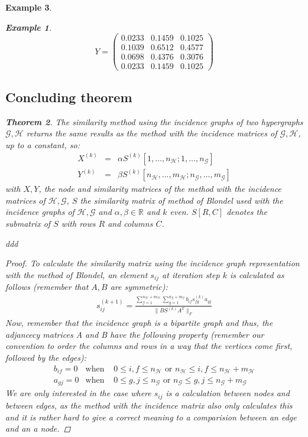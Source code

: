\documentclass[a4paper,11pt]{report}
\newtheorem{theorem}{Theorem}[section]
\newtheorem{example}[theorem]{Example}
\newcommand{\R}{{\mathbb R}}
\newcommand{\hgraf}{\mathcal{G}}
\newcommand{\hgrafeen}{\mathcal{H}}
\begin{document}
\begin{example}
\begin{example}
    $$Y=\begin{pmatrix}
0.0233&0.1459&0.1025\\
0.1039&0.6512&0.4577\\
0.0698&0.4376&0.3076\\
0.0233&0.1459&0.1025
  \end{pmatrix}$$
  

\end{example}
 \subsection{Concluding theorem}
\begin{theorem}
  The similarity method using the incidence graphs of two hypergraphs $\hgraf, \hgrafeen$ returns the same results as the method with the 
  incidence matrices of $\hgraf, \hgrafeen$, up to a constant, so:
\begin{eqnarray*}
  X^{(k)} &=& \alpha S^{(k)}[1,\ldots,n_\hgrafeen;1,\ldots,n_\hgraf]\\
  Y^{(k)} &=& \beta S^{(k)}[n_\hgrafeen,\ldots, m_\hgrafeen;n_\hgraf,\ldots, m_\hgraf]
\end{eqnarray*}
with $X, Y$, the node and similarity matrices of the method with the incidence matrices of $\hgrafeen, \hgraf$, $S$ the 
similarity matrix of method of Blondel used with the incidence graphs of $\hgrafeen, \hgraf$ 
and $\alpha, \beta \in \R$ and $k$ even. $S[R,C]$ denotes the submatrix of $S$ with rows $R$
 and columns $C$. \end{theorem}ddd
 \begin{proof}
To calculate the similarity matrix using the incidence graph representation with the method of Blondel, an element $s_{ij}$ at iteration step $k$ is calculated as follows
(remember that $A, B$ are symmetric):
\begin{eqnarray}\label{simisimi}
s^{(k+1)}_{ij} = \frac{\sum^{n_\hgrafeen + m_\hgrafeen}_{f=1}\sum^{n_\hgraf + m_\hgraf}_{g=1} b_{if}s^{(k)}_{fg}a_{gj}}{\|BS^{(k)}A^T\|_F}
\end{eqnarray}
Now, remember that the incidence graph is a bipartite graph and thus, the 
adjancecy matrices A and B have the following property (remember our convention to order the columns and rows in a way that the vertices come first, followed by the edges):
\begin{eqnarray}\label{nulpoints}
b_{if} = 0  &\text{when }& 0 \leq i,f \leq n_\hgrafeen \text{ or } n_\hgrafeen \leq i,f \leq n_\hgrafeen + 
m_\hgrafeen\\
a_{gj} = 0  &\text{when }& 0 \leq g,j \leq n_\hgraf \text{ or } n_\hgraf \leq g,j \leq n_\hgraf + m_\hgraf
\end{eqnarray}
We are only interested in the case where $s_{ij}$ is a calculation between nodes 
and between edges, as the method with the incidence matrix also only calculates 
this and it is rather hard to give a correct meaning to a comparision between an 
edge and an a node. 


\end{proof}
\end{example}
\end{document}
